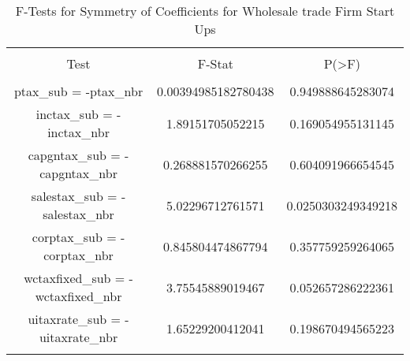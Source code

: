 
\begin{table}[!htbp] \centering 
  \caption{F-Tests for Symmetry of Coefficients for Wholesale trade Firm Start Ups} 
  \label{} 
\begin{tabular}{@{\extracolsep{5pt}} ccc} 
\\[-1.8ex]\hline 
\hline \\[-1.8ex] 
Test & F-Stat & P(\textgreater F) \\ 
\hline \\[-1.8ex] 
ptax\_sub = -ptax\_nbr & 0.00394985182780438 & 0.949888645283074 \\ 
inctax\_sub = -inctax\_nbr & 1.89151705052215 & 0.169054955131145 \\ 
capgntax\_sub = -capgntax\_nbr & 0.268881570266255 & 0.604091966654545 \\ 
salestax\_sub = -salestax\_nbr & 5.02296712761571 & 0.0250303249349218 \\ 
corptax\_sub = -corptax\_nbr & 0.845804474867794 & 0.357759259264065 \\ 
wctaxfixed\_sub = -wctaxfixed\_nbr & 3.75545889019467 & 0.052657286222361 \\ 
uitaxrate\_sub = -uitaxrate\_nbr & 1.65229200412041 & 0.198670494565223 \\ 
\hline \\[-1.8ex] 
\end{tabular} 
\end{table} 
